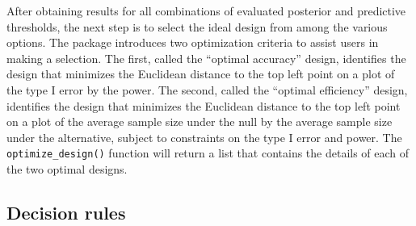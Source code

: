 After obtaining results for all combinations of evaluated posterior and
predictive thresholds, the next step is to select the ideal design from
among the various options. The  package introduces two
optimization criteria to assist users in making a selection. The first,
called the ``optimal accuracy'' design, identifies the design that
minimizes the Euclidean distance to the top left point on a plot of the
type I error by the power. The second, called the ``optimal efficiency''
design, identifies the design that minimizes the Euclidean distance to
the top left point on a plot of the average sample size under the null
by the average sample size under the alternative, subject to constraints
on the type I error and power. The \texttt{optimize\_design()} function
will return a list that contains the details of each of the two optimal
designs.

\hypertarget{decision-rules}{%
\subsection{Decision rules}\label{decision-rules}}

